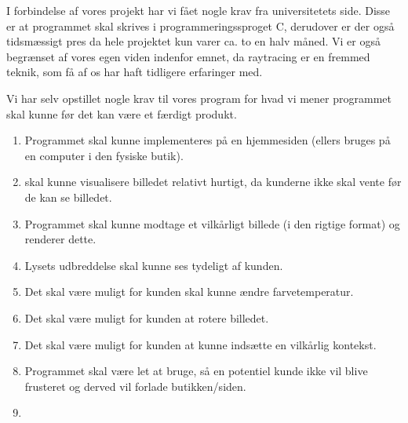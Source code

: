 
I forbindelse af vores projekt har vi fået nogle krav fra universitetets side. Disse er at programmet skal skrives i programmeringssproget C, derudover er der også tidsmæssigt pres da hele projektet kun varer ca. to en halv måned. 
Vi er også begrænset af vores egen viden indenfor emnet, da raytracing er en fremmed teknik, som få af os har haft tidligere erfaringer med. 

Vi har selv opstillet nogle krav til vores program for hvad vi mener programmet skal kunne før det kan være et færdigt produkt.
\begin{enumerate}
    \item Programmet skal kunne implementeres på en hjemmesiden (ellers bruges på en computer i den fysiske butik).
    \item skal kunne visualisere billedet relativt hurtigt, da kunderne ikke skal vente før de kan se billedet.
    \item Programmet skal kunne modtage et vilkårligt billede (i den rigtige format) og renderer dette.
    \item Lysets udbreddelse skal kunne ses tydeligt af kunden.
    \item Det skal være muligt for kunden skal kunne ændre farvetemperatur.
    \item Det skal være muligt for kunden at rotere billedet.
    \item Det skal være muligt for kunden at kunne indsætte en vilkårlig kontekst.
    \item Programmet skal være let at bruge, så en potentiel kunde ikke vil blive frusteret og derved vil forlade butikken/siden.
    \item 
\end{enumerate}



